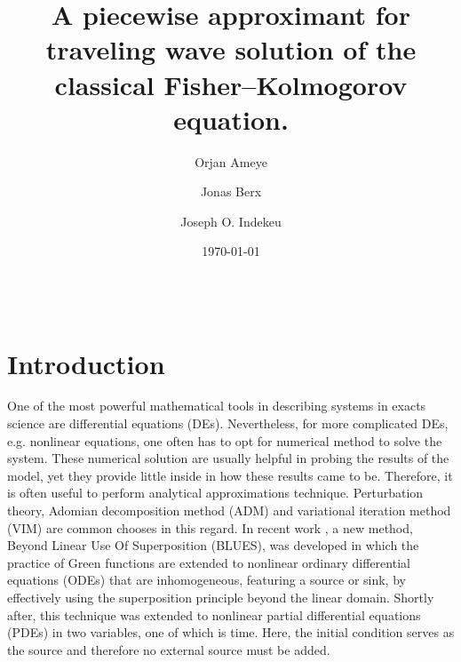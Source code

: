 \documentclass[amsmath,amssymb,amsfonts,aps,pre,preprint,superscriptaddress,bibnotes,showpacs,showkeys,longbibliography]{revtex4-1}
\begin{document}
\title{A piecewise approximant for traveling wave solution of the classical Fisher–Kolmogorov equation.}

\author{Orjan Ameye}

\author{Jonas Berx}

\author{Joseph O. Indekeu}

\date{\today}

\begin{abstract}
\lipsum[2-3]\\
\end{abstract}

\maketitle

\section{Introduction}\label{sec:intro}
One of the most powerful mathematical tools in describing systems in exacts science are differential equations (DEs). Nevertheless, for more complicated DEs, e.g. nonlinear equations, one often has to opt for numerical method to solve the system. These numerical solution are usually helpful in probing the results of the model, yet they provide little inside in how these results came to be. Therefore, it is often useful to perform analytical approximations technique. Perturbation theory, Adomian decomposition method (ADM) and variational iteration method (VIM) are common chooses in this regard. In recent work \cite{Berx_2020,Berx_2019}, a new method, Beyond Linear Use Of Superposition (BLUES), was developed in which the practice of Green functions are extended to nonlinear ordinary differential equations (ODEs) that are inhomogeneous, featuring a source or sink, by effectively using the superposition principle beyond the linear domain. Shortly after, this technique was extended to nonlinear partial differential equations (PDEs) \cite{Berx_2021} in two variables, one of which is time. Here, the initial condition serves as the source and therefore no external source must be added.
\end{document}
